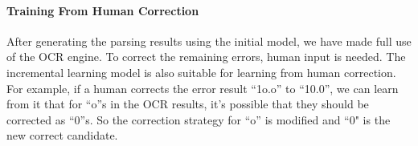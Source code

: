\paragraph{Training From Human Correction}
After generating the parsing results using the initial model, we have 
made full use of the OCR engine. To correct the remaining errors, 
human input is needed. The incremental learning model is also suitable 
for learning from human correction. 
For example, if a human corrects the error result ``1o.o'' to ``10.0'', 
we can learn from it that for ``o''s in the OCR results, it's possible that 
they should be corrected as ``0''s. So the correction strategy 
for ``o'' is modified and ``0" is the new correct candidate. 

